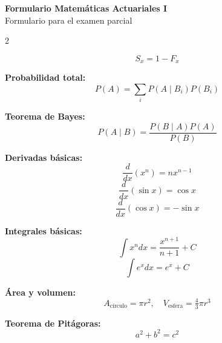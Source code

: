 \documentclass[12pt]{article}
\begin{document}
	
	\begin{center}
		{\LARGE \textbf{Formulario Matemáticas Actuariales I}} \\[1em]
		{\small Formulario para el examen parcial}
	\end{center}
	
	\begin{paracol}{2}
		
		\begin{tcolorbox}[1]
			$$S_x = 1 - F_x$$
		\end{tcolorbox}
		
		\begin{tcolorbox}[probabilidad]
			\textbf{Probabilidad total:}  
			\[
			P(A) = \sum_i P(A \mid B_i)P(B_i)
			\]
			
			\textbf{Teorema de Bayes:}  
			\[
			P(A \mid B) = \frac{P(B \mid A)P(A)}{P(B)}
			\]
		\end{tcolorbox}
		
		\switchcolumn
		
		\begin{tcolorbox}[calculo]
			\textbf{Derivadas básicas:}  
			\[
			\frac{d}{dx}(x^n) = nx^{n-1}
			\]
			\[
			\frac{d}{dx}(\sin x) = \cos x
			\]
			\[
			\frac{d}{dx}(\cos x) = -\sin x
			\]
			
			\textbf{Integrales básicas:}  
			\[
			\int x^n dx = \frac{x^{n+1}}{n+1}+C
			\]
			\[
			\int e^x dx = e^x + C
			\]
		\end{tcolorbox}
		
		\begin{tcolorbox}[geometria]
			\textbf{Área y volumen:}  
			\[
			A_{\text{círculo}} = \pi r^2, \quad 
			V_{\text{esfera}} = \tfrac{4}{3}\pi r^3
			\]
			
			\textbf{Teorema de Pitágoras:}  
			\[
			a^2+b^2=c^2
			\]
		\end{tcolorbox}
		
	\end{paracol}
	
\end{document}

